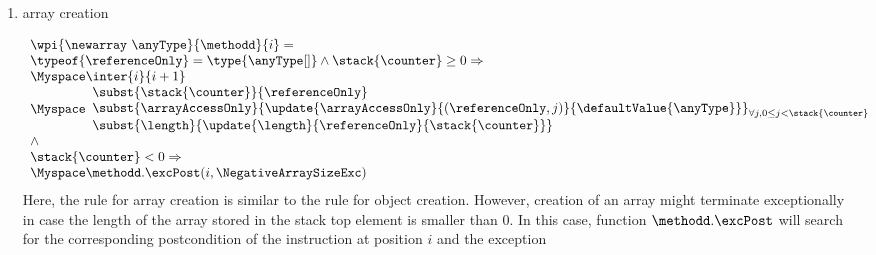 \begin{itemize}
\begin{enumerate}
		
		\item array creation 
	
				 $$\begin{array}{l}
                                         \wpi{\newarray  \ \anyType } {\methodd}{i}  =  \\
				\typeof{\referenceOnly} = \type{\anyType[ ]} \wedge \stack{\counter} \ge 0 \Rightarrow  \\
						\Myspace  \inter{i}{i+1} \\
                                                 \Myspace \begin{array}{l}        
						        \subst{\stack{\counter} }{ \referenceOnly } \\
							\subst{ \arrayAccessOnly }{ \update{\arrayAccessOnly}
                                                                                           {(\referenceOnly, j ) }
                                                                                         {\defaultValue{\anyType} } }_{ { \small \forall j , 0 \leq  j < \stack{\counter} } } \\
                                                          \subst{\length}{\update{\length}{\referenceOnly}{\stack{\counter} } }     
						   \end{array} \\
							\wedge \\
						\stack{\counter} < 0 \Rightarrow  \\
								\Myspace  \methodd.\excPost( i, \NegativeArraySizeExc) \\
                                    \end{array} $$
		  Here, the rule for array creation is similar to the rule for object creation.
		  However, creation of an array might terminate exceptionally in case the length of the array stored 
		  in the stack top element \stack{\counter} is smaller than $0$. In this case, function $\methodd.\excPost$ will search for the corresponding postcondition 
		  of the instruction at position $i$ and the exception \NegativeArraySizeExc
		

\end{enumerate}
\end{itemize}
